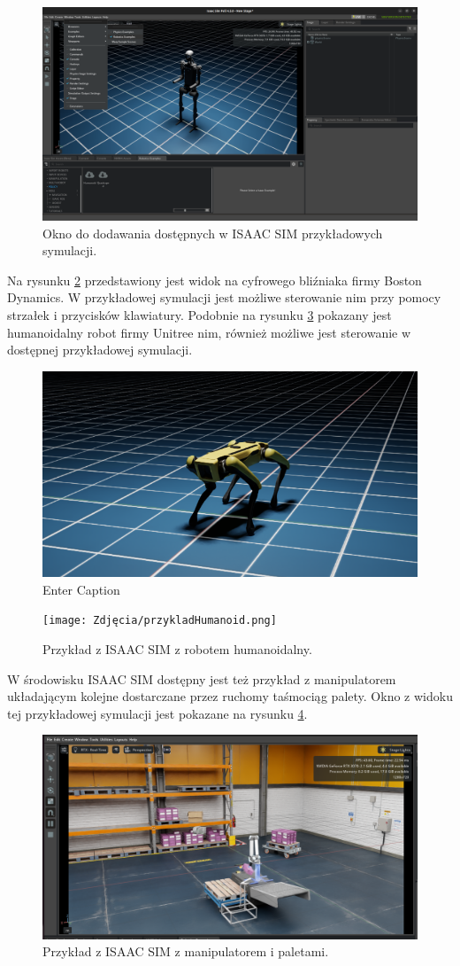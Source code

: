 \documentclass[12pt]{article}
\begin{document}
\begin{figure}[h]
    \centering
    \includegraphics[width=0.5\linewidth]{Zdjęcia/oknoZPrzykladami.png}
    \caption{Okno do dodawania dostępnych w ISAAC SIM przykładowych symulacji.}
    \label{fig:symulacje}
\end{figure}

Na rysunku \ref{fig:bostonDyna} przedstawiony jest widok na cyfrowego bliźniaka firmy Boston Dynamics. W przykładowej symulacji jest możliwe sterowanie nim przy pomocy strzałek i przycisków klawiatury. Podobnie na rysunku \ref{fig:humanoid} pokazany jest humanoidalny robot firmy Unitree nim, również możliwe jest sterowanie w dostępnej przykładowej symulacji.


\begin{figure}[h]
    \centering
    \includegraphics[width=0.5\linewidth]{Zdjęcia/przykladBoston.png}
    \caption{Enter Caption}
    \label{fig:bostonDyna}
\end{figure}

\begin{figure}[h]
    \centering
    \texttt{[image: Zdjęcia/przykladHumanoid.png]}
    \caption{Przykład z ISAAC SIM z robotem humanoidalny.}
    \label{fig:humanoid}
\end{figure}

W środowisku ISAAC SIM dostępny jest też przykład z manipulatorem układającym kolejne dostarczane przez ruchomy taśmociąg palety. Okno z widoku tej przykładowej symulacji jest pokazane na rysunku \ref{fig:palety}.

\begin{figure}[h]
    \centering
    \includegraphics[width=0.5\linewidth]{Zdjęcia/przykladowaPaletyzacja.png}
    \caption{Przykład z ISAAC SIM z manipulatorem i paletami.}
    \label{fig:palety}
\end{figure}
\end{document}
